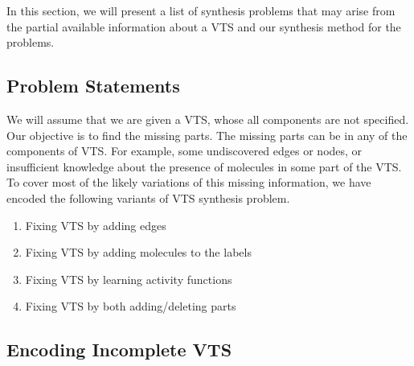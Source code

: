 %
In this section, we will present a list of synthesis problems that may
arise from the partial available information about a VTS and our synthesis method
for the problems.

\subsection{Problem Statements}

We will assume that we are given a VTS, whose all components
are not specified.
%
Our objective is to find the missing parts.
%
The missing parts can be in any of the components of VTS. 
%
For example, some undiscovered edges or nodes, or insufficient
knowledge about the presence of molecules in some part of the VTS.
%
To cover most of the likely variations of this missing information,
we have encoded the following variants of VTS synthesis problem.

\begin{enumerate}
\item Fixing VTS by adding edges 
\item Fixing VTS by adding molecules to the labels
\item Fixing VTS by learning activity functions
\item  Fixing VTS by both adding/deleting parts
\end{enumerate}


\subsection{Encoding Incomplete VTS}

